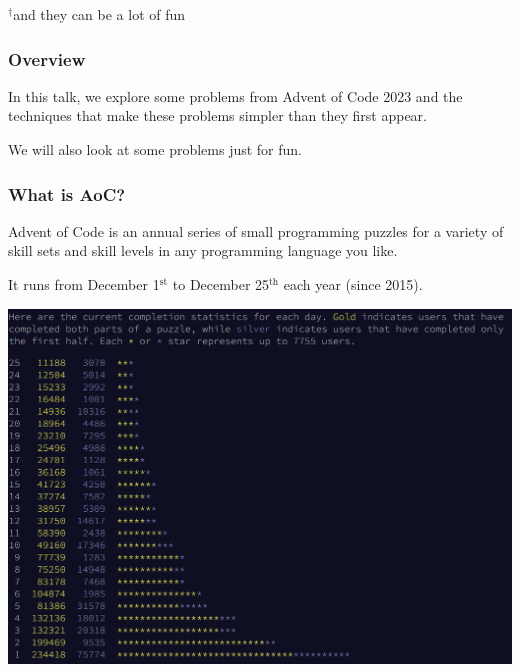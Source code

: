 \titlepage
\vfill
{\footnotesize $^\dagger$and they can be a lot of fun}

\begin{frame}
\frametitle{Overview}

In this talk, we explore some problems from Advent of Code 2023 and the techniques that make these problems simpler than they first appear.
\vspace{3em}

We will also look at some problems just for fun.

\end{frame}


\begin{frame}
\frametitle{What is AoC?}

Advent of Code is an annual series of small programming puzzles for a variety of skill sets and skill levels in any programming language you like.\vfill

It runs from December 1$^\text{st}$ to December 25$^\text{th}$ each year
(since 2015).
\end{frame}

\begin{frame}

\begin{center}
\includegraphics[width=\textwidth]{stats}
\end{center}

\end{frame}


